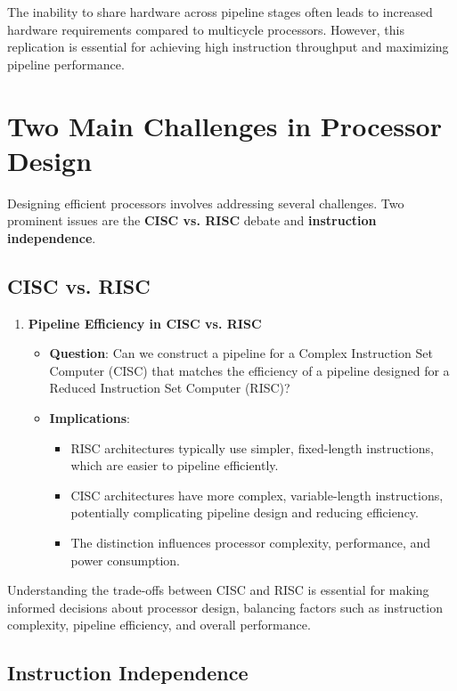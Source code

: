 The inability to share hardware across pipeline stages often leads to increased hardware requirements compared to multicycle processors. However, this replication is essential for achieving high instruction throughput and maximizing pipeline performance.

\section{Two Main Challenges in Processor Design}

Designing efficient processors involves addressing several challenges. Two prominent issues are the \textbf{CISC vs. RISC} debate and \textbf{instruction independence}.

\subsection{CISC vs. RISC}

\begin{enumerate}
    \item \textbf{Pipeline Efficiency in CISC vs. RISC}
    \begin{itemize}
        \item \textbf{Question}: Can we construct a pipeline for a Complex Instruction Set Computer (CISC) that matches the efficiency of a pipeline designed for a Reduced Instruction Set Computer (RISC)?
        \item \textbf{Implications}:
        \begin{itemize}
            \item RISC architectures typically use simpler, fixed-length instructions, which are easier to pipeline efficiently.
            \item CISC architectures have more complex, variable-length instructions, potentially complicating pipeline design and reducing efficiency.
            \item The distinction influences processor complexity, performance, and power consumption.
        \end{itemize}
    \end{itemize}
\end{enumerate}

Understanding the trade-offs between CISC and RISC is essential for making informed decisions about processor design, balancing factors such as instruction complexity, pipeline efficiency, and overall performance.

\subsection{Instruction Independence}

